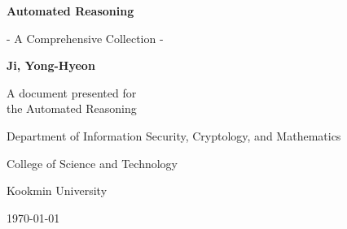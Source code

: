 \begin{titlepage}
    \centering
    
    \vspace*{1cm}
    
    \Huge\textsf{\textbf{Automated Reasoning}}
    
    \vspace{0.5cm}
    \LARGE\textsf{- A Comprehensive Collection -}
    
    \vspace{1.5cm}
    \textbf{Ji, Yong-Hyeon}
    
    \vfill
    
    A document presented for\\
    the Automated Reasoning
    
    \vspace{0.8cm}
    {\large\textsf{Department of Information Security, Cryptology, and Mathematics}\par}
    {\large\textsf{College of Science and Technology}\par}
    {\large\textsf{Kookmin University}\par}
    \vspace{.25in}
    {\large \textsf{\today}\par}
    
\end{titlepage}

